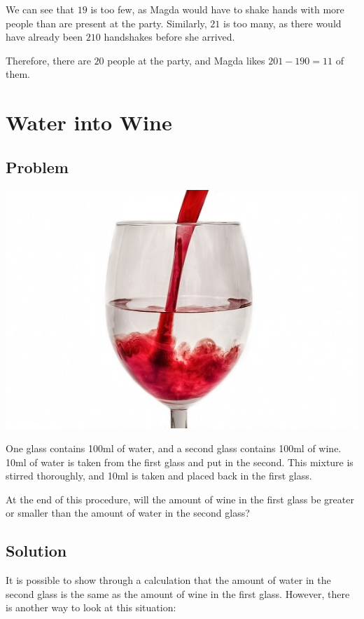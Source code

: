 \documentclass{article}
\begin{document}
We can see that \(19\) is too few, as Magda would have to shake hands with more people than are present at the party. Similarly, \(21\) is too many, as there would have already been \(210\) handshakes before she arrived.

Therefore, there are \(20\) people at the party, and Magda likes \(201-190=\boxed{11}\) of them.

\newpage

\section{Water into Wine}
\subsection{Problem}
\begin{center}
\includegraphics{wine}
\end{center}

One glass contains 100ml of water, and a second glass contains 100ml of wine. 10ml of water is taken from the first glass and put in the second. This mixture is stirred thoroughly, and 10ml is taken and placed back in the first glass.

At the end of this procedure, will the amount of wine in the first glass be greater or smaller than the amount of water in the second glass?

\subsection{Solution}
It is possible to show through a calculation that the amount of water in the second glass is the same as the amount of wine in the first glass. However, there is another way to look at this situation:
\end{document}
